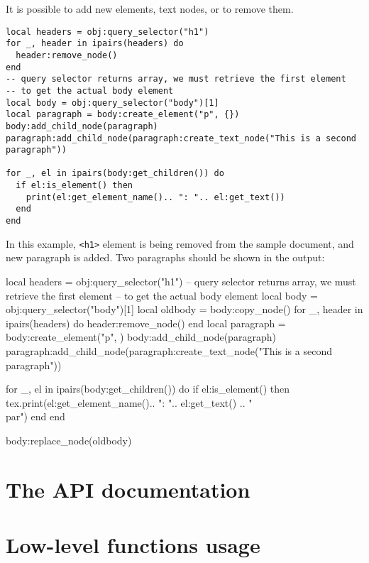 \documentclass{ltxdoc}
\begin{document}
It is possible to add new elements, text nodes, or to remove them. 

\begin{verbatim}
local headers = obj:query_selector("h1")
for _, header in ipairs(headers) do
  header:remove_node()
end
-- query selector returns array, we must retrieve the first element
-- to get the actual body element
local body = obj:query_selector("body")[1]
local paragraph = body:create_element("p", {})
body:add_child_node(paragraph)
paragraph:add_child_node(paragraph:create_text_node("This is a second paragraph"))

for _, el in ipairs(body:get_children()) do
  if el:is_element() then
    print(el:get_element_name().. ": ".. el:get_text())
  end
end
\end{verbatim}

In this example, \verb|<h1>| element is being removed from the sample document, and new 
paragraph is added. Two paragraphs should be shown in the output:

\begin{framed}
  \begin{luacode*}
local headers = obj:query_selector("h1")
-- query selector returns array, we must retrieve the first element
-- to get the actual body element
local body = obj:query_selector("body")[1]
local oldbody = body:copy_node()
for _, header in ipairs(headers) do
  header:remove_node()
end
local paragraph = body:create_element("p", {})
body:add_child_node(paragraph)
paragraph:add_child_node(paragraph:create_text_node("This is a second paragraph"))

for _, el in ipairs(body:get_children()) do
if el:is_element() then
  tex.print(el:get_element_name().. ": ".. el:get_text() .. "\\par")
end
end

body:replace_node(oldbody)
  \end{luacode*}
\end{framed}


\section{The API documentation}



\section{Low-level functions usage}

\end{document}
